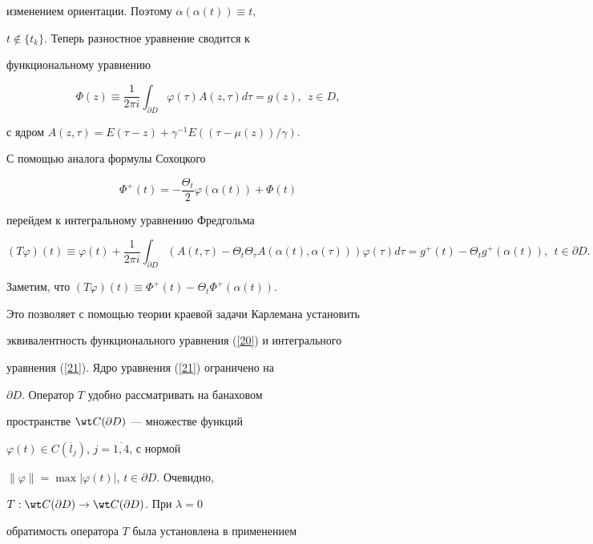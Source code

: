 изменением ориентации. Поэтому $\alpha(\alpha(t))\equiv t$,


$t\notin\{t_k\}$. Теперь разностное уравнение сводится к


функциональному уравнению


\begin{equation}\label{20}


\Phi(z)\equiv\frac{1}{2\pi i}\int_{\partial D}\varphi(\tau)


A(z,\tau)d\tau =g(z),\ \ z\in D,


\end{equation}


с ядром $A(z,\tau)=E(\tau-z)+\gamma^{-1}E((\tau-\mu(z))/\gamma)$.


С помощью аналога формулы Сохоцкого 


$$


\Phi^+(t)=-\frac{\Theta_t}{2}\varphi(\alpha(t))+\Phi(t)


$$


перейдем к интегральному уравнению Фредгольма


\begin{equation}\label{21}


(T\varphi)(t)\equiv\varphi(t){+}\frac{1}{2\pi i}\int_{\partial D}


(A(t,\tau)-\Theta_t\Theta_\tau A(\alpha(t),\alpha(\tau)))\varphi(\tau) 


d\tau = g^+(t)-\Theta_tg^+(\alpha(t)),\ \ t\in\partial D.


\end{equation}


Заметим, что $(T\varphi)(t)\equiv\Phi^+(t)-\Theta_t\Phi^+(\alpha(t))$.


Это позволяет с помощью теории краевой задачи Карлемана установить


эквивалентность функционального уравнения (\ref{20}) и интегрального


уравнения (\ref{21}). Ядро уравнения (\ref{21}) ограничено на


$\partial D$. Оператор $T$ удобно рассматривать на банаховом


пространстве $\wt C(\partial D)$ --- множестве функций


$\varphi(t)\in C(\overline{l}_j)$, $j=\overline{1,4}$, с нормой


$\|\varphi\|=\max|\varphi(t)|$, $t\in\partial D$. Очевидно,


$T:\wt C(\partial D)\to\wt C(\partial D)$. При $\lambda=0$


обратимость оператора $T$ была установлена в \cite{Avtor1} применением


